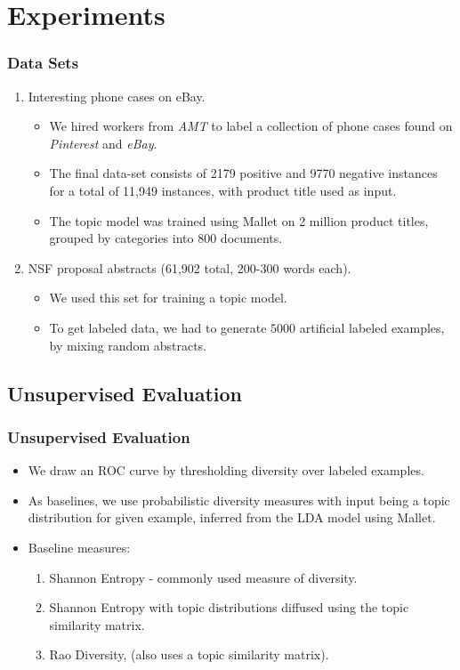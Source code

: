 \documentclass{beamer}
\begin{document}
\section{Experiments}

\begin{frame}
\frametitle{Data Sets}
\begin{enumerate}
\item Interesting phone cases on eBay.
  \begin{itemize}
  \item We hired workers from {\em AMT} to label a collection
of phone cases found on {\em Pinterest} and {\em
  eBay}.
\item The final data-set consists of 2179 positive and 9770 negative instances for
a total of 11,949 instances, with product title used as input. 
\item The topic model was trained using Mallet on 2 million product
  titles, grouped by categories into 800 documents.
\end{itemize}
\item NSF proposal abstracts (61,902 total, 200-300 words each).
\begin{itemize}
\item We used this set 
for training a topic model.
\item To get labeled data, we had to generate $5000$ artificial
  labeled examples, by mixing random abstracts. 
\end{itemize}
\end{enumerate}
\end{frame}

\subsection{Unsupervised Evaluation}

\begin{frame}
\frametitle{Unsupervised Evaluation}
\begin{itemize}
\item We draw an ROC curve by thresholding diversity
  over labeled examples. 
\item As baselines, we use probabilistic diversity
  measures with input being a topic distribution for  given example,
  inferred from the LDA model using Mallet.
\item Baseline measures:
\begin{enumerate}
\item Shannon Entropy - commonly used measure of diversity.
\item Shannon Entropy with topic distributions diffused using the topic
  similarity matrix. 
\item Rao Diversity, (also uses a topic similarity matrix). 
\end{enumerate}
\end{itemize}
\end{frame}
\end{document}
